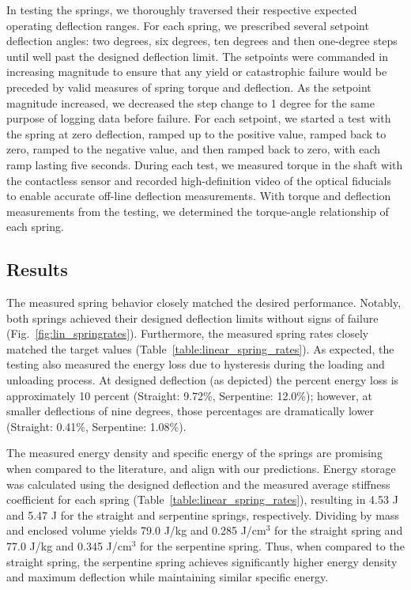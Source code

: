 \documentclass[letterpaper, 10 pt, conference]{ieeeconf} %
\begin{document}
In testing the springs, we thoroughly traversed their respective expected operating deflection ranges. For each spring, we prescribed several setpoint deflection angles: two degrees, six degrees, ten degrees and then one-degree steps until well past the designed deflection limit. The setpoints were commanded in increasing magnitude to ensure that any yield or catastrophic failure would be preceded by valid measures of spring torque and deflection. As the setpoint magnitude increased, we decreased the step change to 1 degree for the same purpose of logging data before failure. For each setpoint, we started a test with the spring at zero deflection, ramped up to the positive value, ramped back to zero, ramped to the negative value, and then ramped back to zero, with each ramp lasting five seconds. During each test, we measured torque in the shaft with the contactless sensor and recorded high-definition video of the optical fiducials to enable accurate off-line deflection measurements. With torque and deflection measurements from the testing, we determined the torque-angle relationship of each spring.

\subsection{Results}

The measured spring behavior closely matched the desired performance. Notably, both springs achieved their designed deflection limits without signs of failure (Fig.~\ref{fig:lin_springrates}). Furthermore, the measured spring rates closely matched the target values (Table~\ref{table:linear_spring_rates}). As expected, the testing also measured the energy loss due to hysteresis during the loading and unloading process. At designed deflection (as depicted) the percent energy loss is approximately 10 percent (Straight: 9.72\%, Serpentine: 12.0\%); however, at smaller deflections of nine degrees, those percentages are dramatically lower (Straight: 0.41\%, Serpentine: 1.08\%).

The measured energy density and specific energy of the springs are promising when compared to the literature, and align with our predictions. Energy storage was calculated using the designed deflection and the measured average stiffness coefficient for each spring (Table~\ref{table:linear_spring_rates}), resulting in 4.53 J and 5.47 J for the straight and serpentine springs, respectively. Dividing by mass and enclosed volume yields 79.0 J/kg and 0.285 J/cm$^{3}$ for the straight spring and 77.0 J/kg and 0.345 J/cm$^{3}$ for the serpentine spring. Thus, when compared to the straight spring, the serpentine spring achieves significantly higher energy density and maximum deflection while maintaining similar specific energy.
\end{document}
